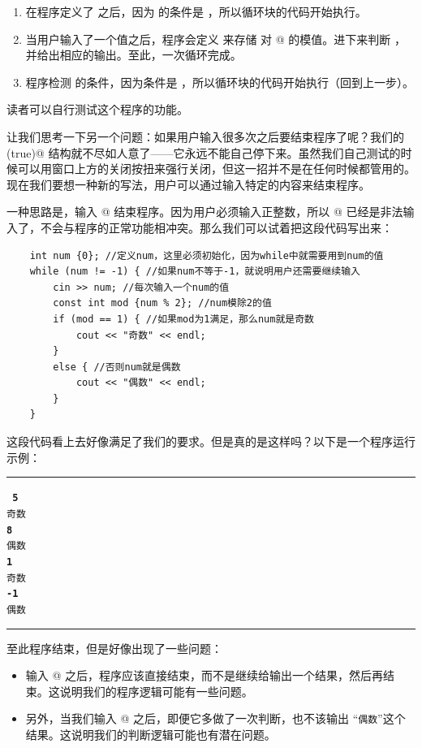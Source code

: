 \begin{enumerate}
    \item 在程序定义了 \lstinline@num@ 之后，因为 \lstinline@while@ 的条件是 \lstinline@true@，所以循环块的代码开始执行。
    \item 当用户输入了一个值之后，程序会定义 \lstinline@mod@ 来存储 \lstinline@num@ 对 @ 的模值。进下来判断 \lstinline@mod@，并给出相应的输出。至此，一次循环完成。
    \item 程序检测 \lstinline@while@ 的条件，因为条件是 \lstinline@true@，所以循环块的代码开始执行（回到上一步）。
\end{enumerate}
读者可以自行测试这个程序的功能。\par
让我们思考一下另一个问题：如果用户输入很多次之后要结束程序了呢？我们的 \lstinline@while(true)@ 结构就不尽如人意了——它永远不能自己停下来。虽然我们自己测试的时候可以用窗口上方的关闭按扭来强行关闭，但这一招并不是在任何时候都管用的。现在我们要想一种新的写法，用户可以通过输入特定的内容来结束程序。\par
一种思路是，输入 @ 结束程序。因为用户必须输入正整数，所以 @ 已经是非法输入了，不会与程序的正常功能相冲突。那么我们可以试着把这段代码写出来：
\begin{lstlisting}
    int num {0}; //定义num，这里必须初始化，因为while中就需要用到num的值
    while (num != -1) { //如果num不等于-1，就说明用户还需要继续输入
        cin >> num; //每次输入一个num的值
        const int mod {num % 2}; //num模除2的值
        if (mod == 1) { //如果mod为1满足，那么num就是奇数
            cout << "奇数" << endl;
        }
        else { //否则num就是偶数
            cout << "偶数" << endl;
        }
    }
\end{lstlisting}
这段代码看上去好像满足了我们的要求。但是真的是这样吗？以下是一个程序运行示例：\\\noindent\rule{\linewidth}{0.2pt}\texttt{
\textbf{5}\\
奇数\\
\textbf{8}\\
偶数\\
\textbf{1}\\
奇数\\
\textbf{-1}\\
偶数
}\\\noindent\rule{\linewidth}{0.2pt}
至此程序结束，但是好像出现了一些问题：
\begin{itemize}
    \item 输入 @ 之后，程序应该直接结束，而不是继续给输出一个结果，然后再结束。这说明我们的程序逻辑可能有一些问题。
    \item 另外，当我们输入 @ 之后，即便它多做了一次判断，也不该输出 ``\texttt{偶数}''这个结果。这说明我们的判断逻辑可能也有潜在问题。
\end{itemize}\par
